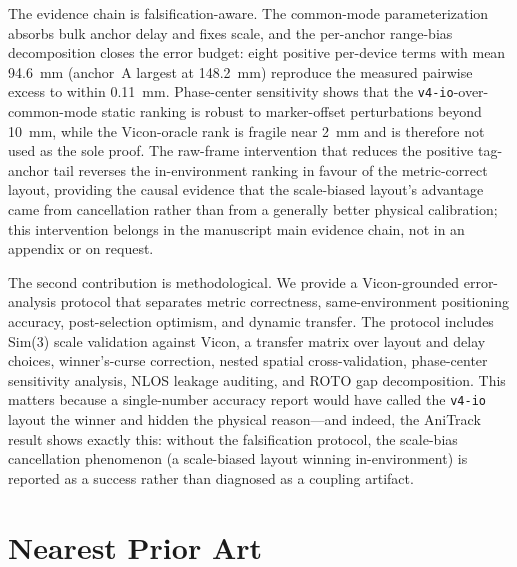 \documentclass[11pt,a4paper]{article}
\begin{document}
The evidence chain is falsification-aware. The common-mode parameterization
absorbs bulk anchor delay and fixes scale, and the per-anchor range-bias decomposition
closes the error budget: eight positive per-device terms with mean 94.6~mm (anchor~A
largest at 148.2~mm) reproduce the measured pairwise excess to within 0.11~mm.
Phase-center sensitivity shows that the \texttt{v4-io}-over-common-mode static ranking
is robust to marker-offset perturbations beyond 10~mm, while the Vicon-oracle rank is
fragile near 2~mm and is therefore not used as the sole proof. The raw-frame
intervention that reduces the positive tag-anchor tail reverses the in-environment
ranking in favour of the metric-correct layout, providing the causal evidence that the
scale-biased layout's advantage came from cancellation rather than from a generally better
physical calibration; this intervention belongs in the manuscript main evidence chain,
not in an appendix or on request.

The second contribution is methodological. We provide a Vicon-grounded
error-analysis protocol that separates metric correctness, same-environment
positioning accuracy, post-selection optimism, and dynamic transfer. The protocol
includes Sim(3) scale validation against Vicon, a transfer matrix over layout and
delay choices, winner's-curse correction, nested spatial cross-validation,
phase-center sensitivity analysis, NLOS leakage auditing, and ROTO gap
decomposition. This matters because a single-number accuracy report would have
called the \texttt{v4-io} layout the winner and hidden the physical reason---and indeed, the AniTrack
result \citep{luder_2025_anitrack} shows exactly this: without the falsification
protocol, the scale-bias cancellation phenomenon (a scale-biased layout winning in-environment) is reported as a success rather than
diagnosed as a coupling artifact.

\section{Nearest Prior Art}
\end{document}
